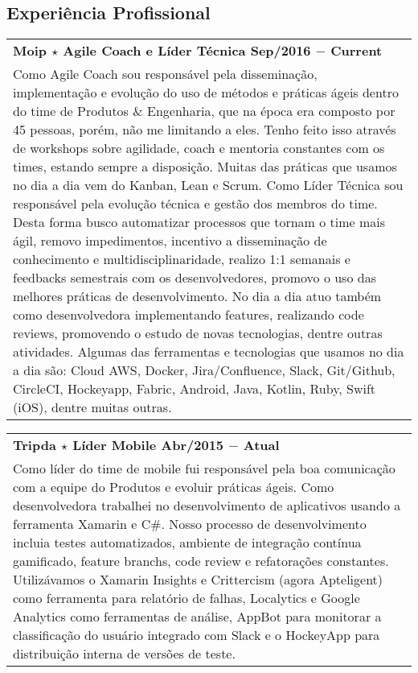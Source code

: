 \documentclass[a4paper, oneside, final]{scrartcl}
\newcommand{\vspc}{\vspace{0.15cm}} %
\begin{document}
\begin{center}
\section{Experiência Profissional}
\begin{tabularx}{1\linewidth}{X}
{\bf Moip $\star$ Agile Coach e Líder Técnica \hfill Sep/2016 $-$ Current} \\
Como Agile Coach sou responsável pela disseminação, implementação e evolução do uso de métodos e práticas ágeis dentro do time de Produtos \& Engenharia, que na época era composto por 45 pessoas, porém, não me limitando a eles. Tenho feito isso através de workshops sobre agilidade, coach e mentoria constantes com os times, estando sempre a disposição. Muitas das práticas que usamos no dia a dia vem do Kanban, Lean e Scrum. Como Líder Técnica sou responsável pela evolução técnica e gestão dos membros do time. Desta forma busco automatizar processos que tornam o time mais ágil, removo impedimentos, incentivo a disseminação de conhecimento e multidisciplinaridade, realizo 1:1 semanais e feedbacks semestrais com os desenvolvedores, promovo o uso das melhores práticas de desenvolvimento. No dia a dia atuo também como desenvolvedora implementando features, realizando code reviews, promovendo o estudo de novas tecnologias, dentre outras atividades. Algumas das ferramentas e tecnologias que usamos no dia a dia são: Cloud AWS, Docker, Jira/Confluence, Slack, Git/Github, CircleCI, Hockeyapp, Fabric, Android, Java, Kotlin, Ruby, Swift (iOS), dentre muitas outras. \vspc\\
\end{tabularx}

\begin{tabularx}{1\linewidth}{X}
{\bf Tripda $\star$ Líder Mobile \hfill Abr/2015 $-$ Atual} \\
Como líder do time de mobile fui responsável pela boa comunicação com a equipe do Produtos e evoluir práticas ágeis. Como desenvolvedora trabalhei no desenvolvimento de aplicativos usando a ferramenta Xamarin e C\#. Nosso processo de desenvolvimento incluia testes automatizados, ambiente de integração contínua gamificado, feature branchs, code review e refatorações constantes. Utilizávamos o Xamarin Insights e Crittercism (agora Apteligent) como ferramenta para relatório de falhas, Localytics e Google Analytics como ferramentas de análise, AppBot para monitorar a classificação do usuário integrado com Slack e o HockeyApp para distribuição interna de versões de teste. \vspc\\
\end{tabularx}


\end{center}
\end{document}

